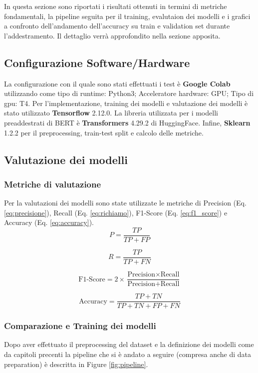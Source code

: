 In questa sezione sono riportati i risultati ottenuti in termini di metriche fondamentali, la pipeline seguita per il training, evalutaion dei modelli e i grafici a confronto dell'andamento dell'accuracy su train e validation set durante l'addestramento. Il dettaglio verrà approfondito nella sezione apposita. 

\subsection{Configurazione Software/Hardware}
La configurazione con il quale sono stati effettuati i test è \textbf{Google Colab} utilizzando come tipo di runtime: Python3; Acceleratore hardware: GPU; Tipo di gpu: T4. Per l'implementazione, training dei modelli e valutazione dei modelli è stato utilizzato \textbf{Tensorflow} 2.12.0. La libreria utilizzata per i modelli preaddestrati di BERT è \textbf{Transformers} 4.29.2 di HuggingFace. Infine, \textbf{Sklearn} 1.2.2 per il preprocessing, train-test split e calcolo delle metriche.  

\subsection{Valutazione dei modelli}
\subsubsection{Metriche di valutazione}
Per la valutazioni dei modelli sono state utilizzate le metriche di Precision (Eq. \ref{eq:precisione}), Recall (Eq. \ref{eq:richiamo}), F1-Score (Eq. \ref{eq:f1_score}) e Accuracy (Eq. \ref{eq:accuracy}).
\begin{equation}
P = \frac{TP}{TP+FP} \label{eq:precisione}
\end{equation}

\begin{equation}
R = \frac{TP}{TP+FN} \label{eq:richiamo}
\end{equation}

\begin{equation}
\text{F1-Score} = 2 \times \frac{\text{Precision} \times \text{Recall}}{\text{Precision} + \text{Recall}} \label{eq:f1_score}
\end{equation}

\begin{equation}
\text{Accuracy} = \frac{TP + TN}{TP + TN + FP + FN} \label{eq:accuracy}
\end{equation}

\subsubsection{Comparazione e Training dei modelli}
Dopo aver effettuato il preprocessing del dataset e la definizione dei modelli come da capitoli precenti la pipeline che si è andato a seguire 
(compresa anche di data preparation) è descritta in Figure \ref{fig:pipeline}.

